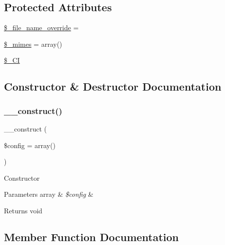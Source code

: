 \subsection*{Protected Attributes}
\begin{DoxyCompactItemize}
\item 
\mbox{\hyperlink{class_c_i___upload_a9f09c7cb693d391de63f9c8e91f159e1}{\$\+\_\+file\+\_\+name\+\_\+override}} = \textquotesingle{}\textquotesingle{}
\item 
\mbox{\hyperlink{class_c_i___upload_a7cc0f09266cdbeff9d73c31b88d5af87}{\$\+\_\+mimes}} = array()
\item 
\mbox{\hyperlink{class_c_i___upload_a9b6039aa2ad20924954fde50a2db8d26}{\$\+\_\+\+CI}}
\end{DoxyCompactItemize}


\subsection{Constructor \& Destructor Documentation}
\mbox{\label{class_c_i___upload_af7f9493844d2d66e924e3c1df51ce616}} 
\subsubsection{\texorpdfstring{\+\_\+\+\_\+construct()}{\_\_construct()}}
{\footnotesize\ttfamily \+\_\+\+\_\+construct (\begin{DoxyParamCaption}\item[{}]{\$config = {\ttfamily array()} }\end{DoxyParamCaption})}

Constructor


\begin{DoxyParams}[1]{Parameters}
array & {\em \$config} & \\
\hline
\end{DoxyParams}
\begin{DoxyReturn}{Returns}
void 
\end{DoxyReturn}


\subsection{Member Function Documentation}
\mbox{\label{class_c_i___upload_a8ac4511eca70b271965b7f8ef00faf66}} 
